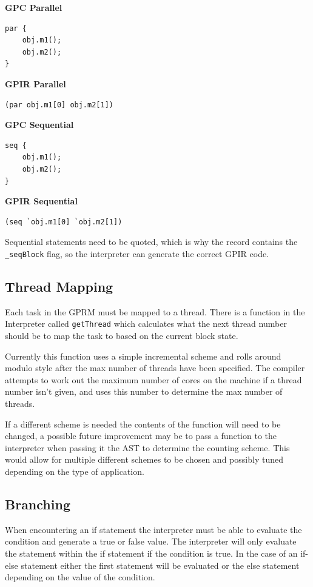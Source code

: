 \begin{minipage}{.48\textwidth}
\center \textbf{GPC Parallel}
\begin{lstlisting}[style=myGPC, frame=single]
par {
    obj.m1();
    obj.m2();
}
\end{lstlisting}

\center \textbf{GPIR Parallel}
\begin{lstlisting}[style=myGPIR, frame=single]
(par obj.m1[0] obj.m2[1])
\end{lstlisting}
\end{minipage}
\hfill
%
%
\begin{minipage}{.48\textwidth}
\center \textbf{GPC Sequential}
\begin{lstlisting}[style=myGPC, frame=single]
seq {
    obj.m1();
    obj.m2();
}
\end{lstlisting}

\center \textbf{GPIR Sequential}
\begin{lstlisting}[style=myGPIR, frame=single]
(seq `obj.m1[0] `obj.m2[1])
\end{lstlisting}
\end{minipage}
 
Sequential statements need to be quoted, which is why the record contains
the \texttt{\_seqBlock} flag, so the interpreter can generate the correct GPIR code.

\subsection{Thread Mapping}
Each task in the GPRM must be mapped to a thread. There is a function
in the Interpreter called \texttt{getThread} which calculates what the next thread 
number should be to map the task to based on the current block state.

Currently this function uses a simple incremental scheme and rolls around
modulo style after the max number of threads have been specified. The compiler
attempts to work out the maximum number of cores on the machine if a thread
number isn't given, and uses this number to determine the max number of threads.

If a different scheme is needed the contents of the function will need to be changed,
a possible future improvement may be to pass a function to the interpreter when passing
it the AST to determine the counting scheme. This would allow for multiple different schemes
to be chosen and possibly tuned depending on the type of application.


\subsection{Branching}
When encountering an if statement the interpreter must be able to evaluate the condition and generate a
true or false value. The interpreter will only evaluate the statement within the if statement
if the condition is true. In the case of an if-else statement either the first statement will
be evaluated or the else statement depending on the value of the condition.


